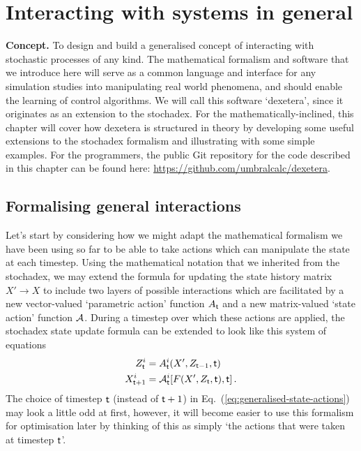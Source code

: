 \chapter{\sffamily Interacting with systems in general}

{\bfseries\sffamily Concept.} To design and build a generalised concept of interacting with stochastic processes of any kind. The mathematical formalism and software that we introduce here will serve as a common language and interface for any simulation studies into manipulating real world phenomena, and should enable the learning of control algorithms. We will call this software `dexetera', since it originates as an extension to the stochadex. For the mathematically-inclined, this chapter will cover how dexetera is structured in theory by developing some useful extensions to the stochadex formalism and illustrating with some simple examples. For the programmers, the public Git repository for the code described in this chapter can be found here: \href{https://github.com/umbralcalc/dexetera}{https://github.com/umbralcalc/dexetera}.

\section{\sffamily Formalising general interactions}

Let's start by considering how we might adapt the mathematical formalism we have been using so far to be able to take actions which can manipulate the state at each timestep. Using the mathematical notation that we inherited from the stochadex, we may extend the formula for updating the state history matrix $X'\rightarrow X$ to include two layers of possible interactions which are facilitated by a new vector-valued `parametric action' function $A_{{\sf t}}$ and a new matrix-valued `state action' function ${\cal A}$. During a timestep over which these actions are applied, the stochadex state update formula can be extended to look like this system of equations
\begin{align}
Z_{{\sf t}}^i &= A_{{\sf t}}^i(X', Z_{{\sf t}-1},{\sf t}) \label{eq:generalised-param-actions} \\
X_{{\sf t}+1}^i &= {\cal A}^i_{{\sf t}}[F(X', Z_{\sf t}, {\sf t}), {\sf t}] \label{eq:generalised-state-actions} \,.
\end{align}
The choice of timestep ${\sf t}$ (instead of ${\sf t}+1$) in Eq.~(\ref{eq:generalised-state-actions}) may look a little odd at first, however, it will become easier to use this formalism for optimisation later by thinking of this as simply `the actions that were taken at timestep ${\sf t}$'.

